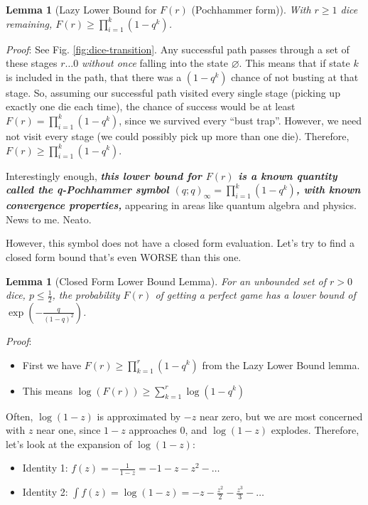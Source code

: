 \documentclass[11pt, oneside]{article} 	%
\newtheorem{lemma}[theorem]{Lemma}
\begin{document}
\begin{lemma}[Lazy Lower Bound for $F(r)$ (Pochhammer form)] With $r \geq 1$ dice remaining, $F(r) \geq \prod_{i=1}^k (1-q^k)$.
\end{lemma}
\textit{Proof}: See Fig. \ref{fig:dice-transition}.  Any successful path passes through a set of these stages $r \ldots 0$ \textit{without once} falling into the state $\varnothing$.  This means that if state $k$ is included in the path, that there was a $(1-q^k)$ chance of not busting at that stage.  So, assuming our successful path visited every single stage (picking up exactly one die each time), the chance of success would be at least $F(r) = \prod_{i=1}^k (1-q^k)$, since we survived every ``bust trap''.  However, we need not visit every stage (we could possibly pick up more than one die).  Therefore, $F(r) \geq \prod_{i=1}^k (1-q^k)$.

Interestingly enough, \textit{\textbf{this lower bound for $F(r)$ is a known quantity called the q-Pochhammer symbol $(q;q)_\infty = \prod_{i=1}^k (1-q^k)$, with known convergence properties,}} appearing in areas like quantum algebra and physics.  News to me.  Neato.

However, this symbol does not have a closed form evaluation.  Let's try to find a closed form bound that's even WORSE than this one.

\begin{lemma}[Closed Form Lower Bound Lemma]For an unbounded set of $r > 0$ dice, $p \leq \frac1{2}$, the probability $F(r)$ of getting a perfect game has a lower bound of $\exp(-\frac{q}{(1-q)^2})$.
\end{lemma}
\textit{Proof}:
\begin{itemize}
\item First we have $F(r) \geq \prod_{k=1}^r (1-q^k)$ from the Lazy Lower Bound lemma.
\item This means $\log(F(r)) \geq \sum_{k=1}^r \log(1-q^k)$ 
\end{itemize}


Often, $\log(1-z)$ is approximated by $-z$ near zero, but we are most concerned with $z$ near one, since $1-z$ approaches 0, and $\log(1-z)$ explodes.  Therefore, let's look at the expansion of $\log(1-z)$:
\begin{itemize}
\item Identity 1: $f(z) = -\frac1{1-z} = - 1 - z - z^2 -  \ldots$
\item Identity 2: $\int f(z) = \log(1-z) = -z-\frac{z^2}{2} - \frac{z^3}{3} - \ldots$
\end{itemize}
\end{document}
